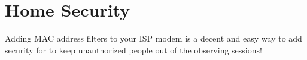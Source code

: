 \section{Home Security}

Adding MAC address filters to your ISP modem is a decent and easy way
to add security for to keep unauthorized people out of the observing
sessions!

